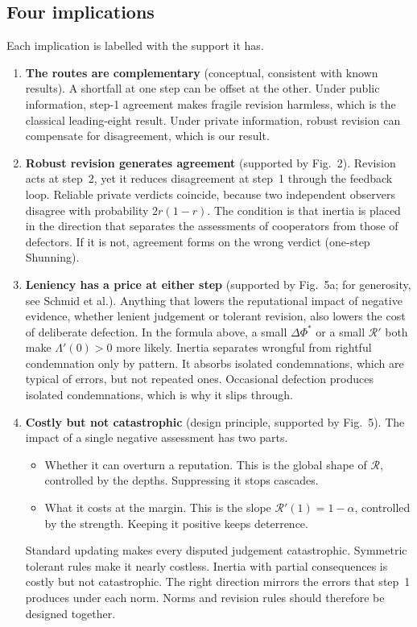 \documentclass[11pt]{article}
\newcommand{\Rmap}{\mathscr{R}}
\begin{document}
\subsection*{Four implications}
Each implication is labelled with the support it has.
\begin{enumerate}[leftmargin=1.5em]
\item \textbf{The routes are complementary} (conceptual, consistent with known results). A shortfall at one step can be offset at the other. Under public information, step-1 agreement makes fragile revision harmless, which is the classical leading-eight result. Under private information, robust revision can compensate for disagreement, which is our result.
\item \textbf{Robust revision generates agreement} (supported by Fig.~2). Revision acts at step~2, yet it reduces disagreement at step~1 through the feedback loop. Reliable private verdicts coincide, because two independent observers disagree with probability $2r(1-r)$. The condition is that inertia is placed in the direction that separates the assessments of cooperators from those of defectors. If it is not, agreement forms on the wrong verdict (one-step Shunning).
\item \textbf{Leniency has a price at either step} (supported by Fig.~5a; for generosity, see Schmid et al.\cite{schmid2021}). Anything that lowers the reputational impact of negative evidence, whether lenient judgement or tolerant revision, also lowers the cost of deliberate defection. In the formula above, a small $\Delta\Phi^*$ or a small $\Rmap'$ both make $\Lambda'(0)>0$ more likely. Inertia separates wrongful from rightful condemnation only by pattern. It absorbs isolated condemnations, which are typical of errors, but not repeated ones. Occasional defection produces isolated condemnations, which is why it slips through.
\item \textbf{Costly but not catastrophic} (design principle, supported by Fig.~5). The impact of a single negative assessment has two parts.
  \begin{itemize}[leftmargin=1.2em]
  \item Whether it can overturn a reputation. This is the global shape of $\Rmap$, controlled by the depths. Suppressing it stops cascades.
  \item What it costs at the margin. This is the slope $\Rmap'(1)=1-\alpha$, controlled by the strength. Keeping it positive keeps deterrence.
  \end{itemize}
  Standard updating makes every disputed judgement catastrophic. Symmetric tolerant rules make it nearly costless. Inertia with partial consequences is costly but not catastrophic. The right direction mirrors the errors that step~1 produces under each norm. Norms and revision rules should therefore be designed together.
\end{enumerate}
\end{document}
